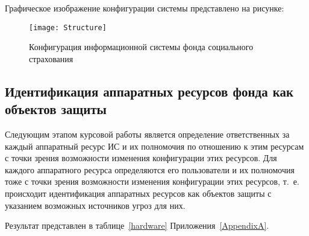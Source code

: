 \point Графическое изображение конфигурации системы представлено на
рисунке:

\begin{figure}[h]
  \centering
  \texttt{[image: Structure]}
  \caption{Конфигурация информационной системы фонда социального страхования}
  \label{fig:structure}  
\end{figure}

\subsection{Идентификация аппаратных ресурсов
  фонда как объектов защиты}

Следующим этапом курсовой работы является определение ответственных за
каждый аппаратный ресурс ИС и их полномочия по отношению к этим
ресурсам с точки зрения возможности изменения конфигурации этих
ресурсов. Для каждого аппаратного ресурса определяются его
пользователи и их полномочия тоже с точки зрения возможности изменения
конфигурации этих ресурсов, т.~е. происходит идентификация аппаратных
ресурсов как объектов защиты с указанием возможных источников угроз
для них.

Результат представлен в таблице~\ref{hardware}
Приложения~\ref{AppendixA}.

